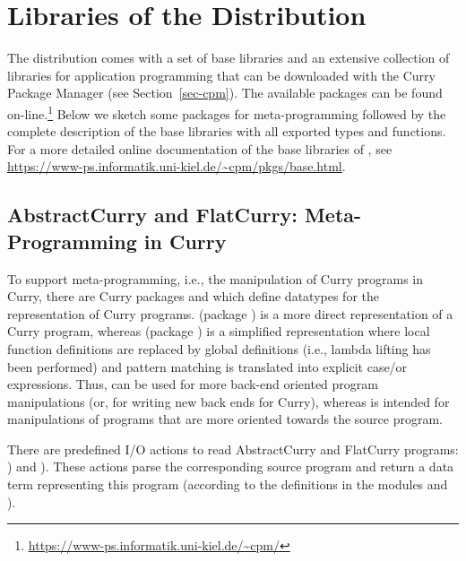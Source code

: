 \section{Libraries of the \CYS Distribution}
\label{sec:libraries}

{\setlength{\parindent}{0.0cm}

The \CYS distribution comes with a set of base libraries
and an extensive collection of libraries for application programming
that can be downloaded with the Curry Package Manager
(see Section~\ref{sec-cpm}).
The available packages can be found on-line.\footnote{%
\url{https://www-ps.informatik.uni-kiel.de/~cpm/}}
Below we sketch some packages for meta-programming
followed by the complete description of the base libraries
with all exported types and functions.
For a more detailed online documentation of the base libraries of \CYS,
see \url{https://www-ps.informatik.uni-kiel.de/~cpm/pkgs/base.html}.

\subsection{AbstractCurry and FlatCurry: Meta-Programming in Curry}
\label{sec-flatcurry}

To support meta-programming, i.e., the manipulation of Curry programs
in Curry, there are Curry packages  and 
which define datatypes for the representation of Curry programs.
 (package )
is a more direct representation of a Curry program,
whereas  (package )
is a simplified representation
where local function definitions are replaced by global definitions
(i.e., lambda lifting has been performed) and pattern matching
is translated into explicit case/or expressions.
Thus,  can be used for more back-end oriented
program manipulations (or, for writing new back ends for Curry),
whereas  is intended for manipulations of
programs that are more oriented towards the source program.

There are predefined I/O actions to read AbstractCurry and
FlatCurry programs: )
and ).
These actions parse the corresponding source program and return
a data term representing this program (according to the definitions
in the modules  and ).

}
